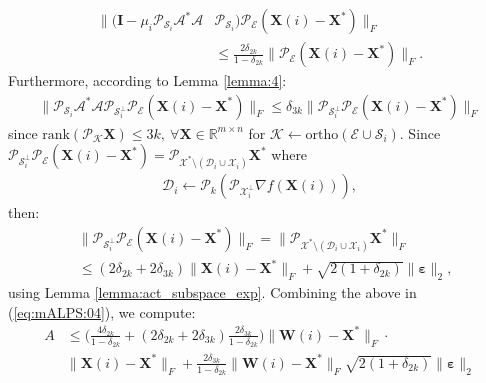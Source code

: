 \documentclass[twocolumn]{svjour3}
\newcommand{\vectornormbig}[1]{\big\|#1\big\|}
\newcommand{\sensing}{\boldsymbol{\mathcal{A}}}
\newcommand{\signal}{\boldsymbol{X}}
\newcommand{\bestsignal}{\boldsymbol{X}^\ast}
\newcommand{\noise}{\boldsymbol{\varepsilon}}
\newcommand{\dimension}{m \times n}
\newcommand{\id}{\mathbf{I}}
\newcommand{\rank}{k}
\begin{document}
\begin{align}
\vectornormbig{(\id - \mu_i\mathcal{P}_{\mathcal{S}_i}\sensing^\ast \sensing& \mathcal{P}_{\mathcal{S}_i})\mathcal{P}_{\mathcal{E}}(\signal(i) - \bestsignal)}_F \nonumber \\ &\leq \frac{2\delta_{2\rank}}{1-\delta_{2\rank}} \vectornormbig{\mathcal{P}_{\mathcal{E}}(\signal(i) - \bestsignal)}_F. \nonumber
\end{align} Furthermore, according to Lemma \ref{lemma:4}:
\begin{align}
\vectornormbig{\mathcal{P}_{\mathcal{S}_i}\sensing^\ast \sensing \mathcal{P}_{\mathcal{S}_i^{\bot}}\mathcal{P}_{\mathcal{E}}(\signal(i) - \bestsignal)}_F \leq  \delta_{3\rank} \vectornormbig{\mathcal{P}_{\mathcal{S}_i^{\bot}}\mathcal{P}_{\mathcal{E}}(\signal(i) - \bestsignal)}_F \nonumber
\end{align} since $ \text{rank}(\mathcal{P}_{\mathcal{K}}\signal) \leq 3\rank, ~\forall \signal \in \mathbb{R}^{\dimension} $ for $\mathcal{K} \leftarrow \text{ortho}(\mathcal{E} \cup \mathcal{S}_i)$. Since $ \mathcal{P}_{\mathcal{S}_i^{\bot}}\mathcal{P}_{\mathcal{E}}(\signal(i) - \bestsignal) = \mathcal{P}_{\mathcal{X}^\ast \setminus (\mathcal{D}_i \cup \mathcal{X}_i)}\bestsignal $ where 
\begin{align}
\mathcal{D}_i \leftarrow \mathcal{P}_{k}\left(\mathcal{P}_{\mathcal{X}_i^{\bot}}\nabla f(\signal(i))\right), \nonumber
\end{align} then:
\begin{align}
&\vectornormbig{\mathcal{P}_{\mathcal{S}_i^{\bot}}\mathcal{P}_{\mathcal{E}}(\signal(i) - \bestsignal)}_F = \vectornormbig{\mathcal{P}_{\mathcal{X}^\ast \setminus (\mathcal{D}_i \cup \mathcal{X}_i)}\bestsignal}_F \nonumber \\ &\leq (2\delta_{2\rank} + 2\delta_{3\rank})\vectornormbig{\signal(i) - \bestsignal}_F + \sqrt{2(1+\delta_{2\rank})}\vectornormbig{\noise}_2, \nonumber
\end{align} using Lemma \ref{lemma:act_subspace_exp}. Combining the above in (\ref{eq:mALPS:04}), we compute:
\begin{align}
A 
&\leq \Big(\frac{4\delta_{2\rank}}{1-\delta_{2\rank}} + (2\delta_{2\rank} + 2\delta_{3\rank})\frac{2\delta_{3\rank}}{1-\delta_{2\rank}}\Big)\vectornormbig{\boldsymbol{W}(i) - \bestsignal}_F \cdot \nonumber \\ & \vectornormbig{\signal(i) - \bestsignal}_F + \frac{2\delta_{3\rank}}{1-\delta_{2\rank}}  \vectornormbig{\boldsymbol{W}(i) - \bestsignal}_F \sqrt{2(1+\delta_{2\rank})}\vectornormbig{\noise}_2 \label{eq:mALPS0:03}
\end{align}
\end{document}
